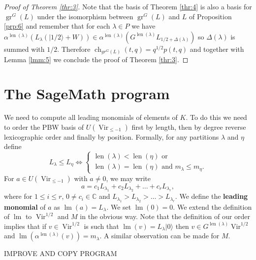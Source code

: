 \documentclass[12pt,a4paper]{article}
\DeclareMathOperator{\Vir}{Vir}
\DeclareMathOperator{\gr}{gr}
\DeclareMathOperator{\ch}{ch}
\DeclareMathOperator{\lm}{lm}
\DeclareMathOperator{\len}{len}
\newcommand{\vac}{|0\rangle}
\newcommand{\vachalf}{|1/2\rangle}
\begin{document}
\begin{proof}[Proof of Theorem \ref{thr:3}]
  Note that the basis of Theorem \ref{thr:4} is also a basis for $\gr^G(L)$ under the isomorphism between $\gr^G(L)$ and $L$ of Proposition \ref{prp:6} and remember that for each $\lambda\in P$ we have $\alpha^{\len(\lambda)}(L_\lambda(\vachalf+W))\in \alpha^{\len(\lambda)}(G^{\len(\lambda)}L_{1/2+\Delta(\lambda)})$ so $\Delta(\lambda)$ is summed with $1/2$.
  Therefore $\ch_{gr^G(L)}(t,q)=q^{1/2}p(t,q)$ and together with Lemma \ref{lmm:5} we conclude the proof of Theorem \ref{thr:3}.
\end{proof}

\appendix
\section{The SageMath program}
\label{sec:sagem-progr-comp}

We need to compute all leading monomials of elements of $K$.
To do this we need to order the PBW basis of $U(\Vir_{\le-1})$ first by length, then by degree reverse lexicographic order and finally by position.
Formally, for any partitions $\lambda$ and $\eta$ define
\begin{equation*}
  L_\lambda\le L_\eta \iff
  \begin{cases}
    \len(\lambda)<\len(\eta) \text{ or }\\
    \len(\lambda)=\len(\eta)\text{ and } m_\lambda\le m_\eta.
  \end{cases}
\end{equation*}
For $a\in U(\Vir_{\le -1})$ with $a\neq 0$, we may write
\begin{equation*}
  a = c_1L_{\lambda_1}+c_2L_{\lambda_2}+\dots+c_rL_{\lambda_r},
\end{equation*}
where for $1\le i\le r$, $0\neq c_i\in \mathbb{C}$ and $L_{\lambda_1}>L_{\lambda_2}>\dots>L_{\lambda_r}$.
We define the \textbf{leading monomial} of $a$ as $\lm(a)=L_\lambda$.
We set $\lm(0)=0$.
We extend the definition of $\lm$ to $\Vir^{1/2}$ and $M$ in the obvious way.
Note that the definition of our order implies that if $v\in \Vir^{1/2}$ is such that $\lm(v)=L_\lambda\vac$ then $v\in G^{\len(\lambda)}\Vir^{1/2}$ and $\lm(\alpha^{\len(\lambda)}(v))=m_\lambda$.
A similar observation can be made for $M$.

IMPROVE AND COPY PROGRAM  



\end{document}

